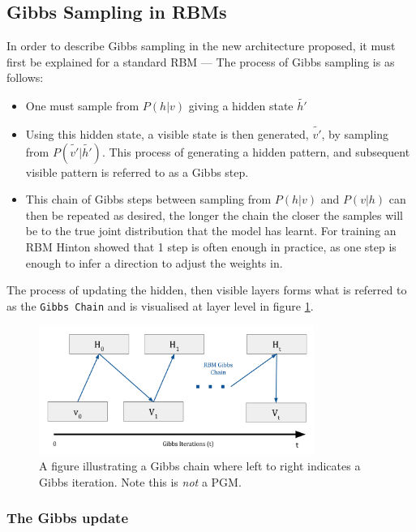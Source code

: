 \subsection{Gibbs Sampling in RBMs}
%
In order to describe Gibbs sampling in the new architecture proposed, it must first be explained for a standard RBM --- The process of Gibbs sampling is as follows:
  \begin{itemize}
    \item One must sample from $P(h|v)$ giving a hidden state $\tilde{h'}$
    \item Using this hidden state, a visible state is then generated, $\tilde{v'}$, by sampling from $P(\tilde{v'}|\tilde{h'})$. This process of generating a hidden pattern, and subsequent visible pattern is referred to as a Gibbs step.
    \item This chain of Gibbs steps between sampling from $P(h|v)$ and $P(v|h)$ can then be repeated as desired, the longer the chain the closer the samples will be to the true joint distribution that the model has learnt. For training an RBM Hinton showed that 1 step is often enough in practice, as one step is enough to infer a direction to adjust the weights in.
  \end{itemize}
  The process of updating the hidden, then visible layers forms what is referred to as the \texttt{Gibbs Chain} and is visualised at layer level in figure \ref{F:Gibbs_Chain}.
  \begin{figure}[h]
    \begin{center}
      \includegraphics[width=0.8\textwidth]{Assets/RBM-Gibbs-Chain.png}
    \end{center}
    \caption{A figure illustrating a Gibbs chain where left to right indicates a Gibbs iteration. Note this is \emph{not} a PGM.}
    \label{F:Gibbs_Chain}
  \end{figure}

  \subsubsection{The Gibbs update}\label{S:Gibbs-Update}


